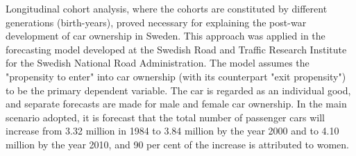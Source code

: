 Longitudinal cohort analysis, where the cohorts are constituted by different generations (birth-years), proved necessary for explaining the post-war development of car ownership in Sweden. This approach was applied in the forecasting model developed at the Swedish Road and Traffic Research Institute for the Swedish National Road Administration. The model assumes the "propensity to enter" into car ownership (with its counterpart "exit propensity") to be the primary dependent variable. The car is regarded as an individual good, and separate forecasts are made for male and female car ownership. In the main scenario adopted, it is forecast that the total number of passenger cars will increase from 3.32 million in 1984 to 3.84 million by the year 2000 and to 4.10 million by the year 2010, and 90 per cent of the increase is attributed to women.
